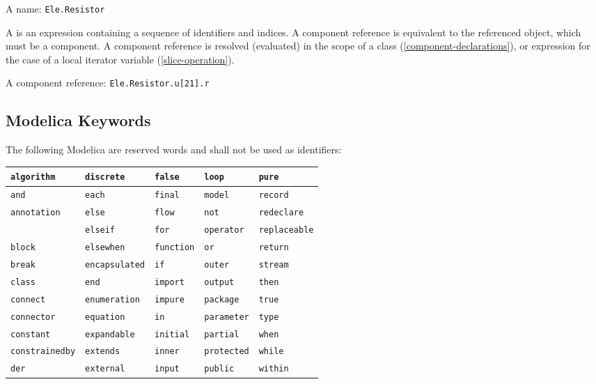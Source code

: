 \begin{example}
A name: \lstinline!Ele.Resistor!
\end{example}

A  is an expression containing a sequence of identifiers and indices.
A component reference is equivalent to the referenced object, which must be a component.
A component reference is resolved (evaluated) in the scope of a class (\cref{component-declarations}), or expression for the case of a local iterator variable (\cref{slice-operation}).

\begin{example}
A component reference: \lstinline!Ele.Resistor.u[21].r!
\end{example}

\subsection{Modelica Keywords}\label{modelica-keywords}

The following Modelica  are reserved words and shall not be used as identifiers:
\begin{center}
\begin{tabular}{l l l l l}
{\lstinline!algorithm!} & {\lstinline!discrete!} & {\lstinline!false!} & {\lstinline!loop!} & {\lstinline!pure!}\\ \hline
{\lstinline!and!} & {\lstinline!each!} & {\lstinline!final!} & {\lstinline!model!} & {\lstinline!record!}\\ \hline
{\lstinline!annotation!} & {\lstinline!else!} & {\lstinline!flow!} & {\lstinline!not!} & {\lstinline!redeclare!}\\ \hline
& {\lstinline!elseif!} & {\lstinline!for!} & {\lstinline!operator!} & {\lstinline!replaceable!}\\ \hline
{\lstinline!block!} & {\lstinline!elsewhen!} & {\lstinline!function!} & {\lstinline!or!} & {\lstinline!return!}\\ \hline
{\lstinline!break!} & {\lstinline!encapsulated!} & {\lstinline!if!} & {\lstinline!outer!} & {\lstinline!stream!}\\ \hline
{\lstinline!class!} & {\lstinline!end!} & {\lstinline!import!} & {\lstinline!output!} & {\lstinline!then!}\\ \hline
{\lstinline!connect!} & {\lstinline!enumeration!} & {\lstinline!impure!} & {\lstinline!package!} & {\lstinline!true!}\\ \hline
{\lstinline!connector!} & {\lstinline!equation!} & {\lstinline!in!} & {\lstinline!parameter!} & {\lstinline!type!}\\ \hline
{\lstinline!constant!} & {\lstinline!expandable!} & {\lstinline!initial!} & {\lstinline!partial!} & {\lstinline!when!}\\ \hline
{\lstinline!constrainedby!} & {\lstinline!extends!} & {\lstinline!inner!} & {\lstinline!protected!} & {\lstinline!while!}\\ \hline
{\lstinline!der!} & {\lstinline!external!} & {\lstinline!input!} & {\lstinline!public!} & {\lstinline!within!}\\
\end{tabular}
\end{center}

